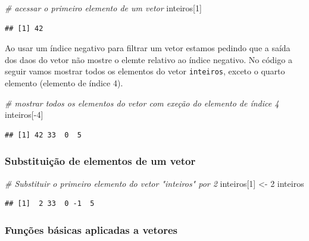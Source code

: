 \documentclass[
]{article}
\newenvironment{Shaded}{\begin{snugshade}}{\end{snugshade}}
\newcommand{\CommentTok}[1]{\textcolor[rgb]{0.56,0.35,0.01}{\textit{#1}}}
\newcommand{\DecValTok}[1]{\textcolor[rgb]{0.00,0.00,0.81}{#1}}
\newcommand{\NormalTok}[1]{#1}
\newcommand{\OtherTok}[1]{\textcolor[rgb]{0.56,0.35,0.01}{#1}}
\newcommand{\SpecialCharTok}[1]{\textcolor[rgb]{0.00,0.00,0.00}{#1}}
\begin{document}
\begin{Shaded}
\begin{Highlighting}[]
\CommentTok{\# acessar o primeiro elemento de um vetor}
\NormalTok{inteiros[}\DecValTok{1}\NormalTok{]}
\end{Highlighting}
\end{Shaded}

\begin{verbatim}
## [1] 42
\end{verbatim}

Ao usar um índice negativo para filtrar um vetor estamos pedindo que a
saída dos daos do vetor não mostre o elemte relativo ao índice negativo.
No código a seguir vamos mostrar todos os elementos do vetor
\texttt{inteiros}, exceto o quarto elemento (elemento de índice 4).

\begin{Shaded}
\begin{Highlighting}[]
\CommentTok{\# mostrar todos os elementos do vetor com exeção do elemento de índice 4}
\NormalTok{inteiros[}\SpecialCharTok{{-}}\DecValTok{4}\NormalTok{]}
\end{Highlighting}
\end{Shaded}

\begin{verbatim}
## [1] 42 33  0  5
\end{verbatim}

\hypertarget{substituiuxe7uxe3o-de-elementos-de-um-vetor}{%
\subsubsection{Substituição de elementos de um
vetor}\label{substituiuxe7uxe3o-de-elementos-de-um-vetor}}

\begin{Shaded}
\begin{Highlighting}[]
\CommentTok{\# Substituir o primeiro elemento do vetor "inteiros" por 2}
\NormalTok{inteiros[}\DecValTok{1}\NormalTok{] }\OtherTok{\textless{}{-}} \DecValTok{2}
\NormalTok{inteiros}
\end{Highlighting}
\end{Shaded}

\begin{verbatim}
## [1]  2 33  0 -1  5
\end{verbatim}

\hypertarget{funuxe7uxf5es-buxe1sicas-aplicadas-a-vetores}{%
\subsubsection{Funções básicas aplicadas a
vetores}\label{funuxe7uxf5es-buxe1sicas-aplicadas-a-vetores}}
\end{document}

